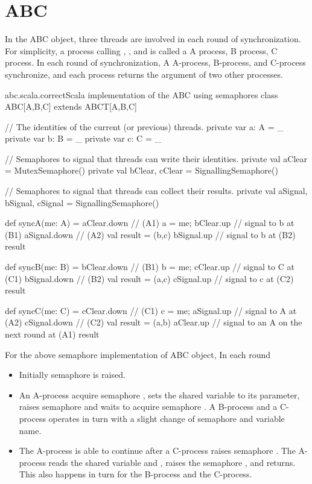 \documentclass{article}
\begin{document}
\section{ABC}
In the ABC object, three threads are involved in each round of synchronization. For simplicity, a process calling , , and  is called a A process, B process, C process. In each round of synchronization, A A-process, B-process, and C-process synchronize, and each process returns the argument of two other processes. 

\begin{scalafloat}{abc.scala.correct}{Scala implementation of the ABC using semaphores}
class ABC[A,B,C] extends ABCT[A,B,C]{
  // The identities of the current (or previous) threads.
  private var a: A = _
  private var b: B = _
  private var c: C = _

  // Semaphores to signal that threads can write their identities.
  private val aClear = MutexSemaphore()
  private val bClear, cClear = SignallingSemaphore()

  // Semaphores to signal that threads can collect their results. 
  private val aSignal, bSignal, cSignal = SignallingSemaphore()

  def syncA(me: A) = {
    aClear.down         // (A1)
    a = me; bClear.up   // signal to b at (B1)
    aSignal.down        // (A2)
    val result = (b,c)
    bSignal.up          // signal to b at (B2)
    result
  }

  def syncB(me: B) = {
    bClear.down         // (B1)
    b = me; cClear.up   // signal to C at (C1)
    bSignal.down        // (B2)
    val result = (a,c)
    cSignal.up          // signal to c at (C2)
    result
  }

  def syncC(me: C) = {
    cClear.down         // (C1)
    c = me; aSignal.up  // signal to A at (A2)
    cSignal.down        // (C2)
    val result = (a,b)
    aClear.up           // signal to an A on the next round at (A1)
    result
  }
}      
\end{scalafloat}

For the above semaphore implementation of ABC object, In each round
\begin{itemize}
    \item Initially semaphore  is raised.
    \item An A-process acquire semaphore , sets the shared variable  to its parameter, raises semaphore  and waits to acquire semaphore . A B-process and a C-process operates in turn with a slight change of semaphore and variable name.
    \item The A-process is able to continue after a C-process raises semaphore . The A-process reads the shared variable  and , raises the semaphore , and returns. This also happens in turn for the B-process and the C-process.
\end{itemize}
\end{document}

